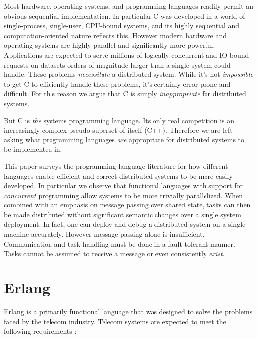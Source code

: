 \documentclass[10pt,a4paper,twocolumn]{article}
\begin{document}
Most hardware, operating systems, and programming languages readily permit an
obvious sequential implementation. In particular C was developed in a world of
single-process, single-user, CPU-bound systems, and its highly sequential and
computation-oriented nature reflects this. However modern hardware
and operating systems are highly parallel and significantly more powerful.
Applications are expected to serve millions of logically concurrent and IO-bound
requests on datasets orders of magnitude larger than a single system could
handle. These problems \emph{necessitate} a distributed system. While it's not
\emph{impossible} to get C to efficiently handle these problems, it's certainly
error-prone and difficult. For this reason we argue that C is simply
\emph{inappropriate} for distributed systems.

But C is \emph{the} systems programming language. Its only real competition is
an increasingly complex pseudo-superset of itself (C++). Therefore we are left
asking what programming languages \emph{are} appropriate for distributed systems
to be implemented in.

This paper surveys the programming language literature for how different
languages enable efficient and correct distributed systems to be more easily
developed. In particular we observe that functional languages with support for
\emph{concurrent} programming allow systems to be more trivially parallelized.
When combined with an emphasis on message passing over shared state, tasks can
then be made distributed without significant semantic changes over a single
system deployment. In fact, one can deploy and debug a distributed system on a
single machine accurately. However message passing alone is insufficient.
Communication and task handling must be done in a fault-tolerant manner. Tasks
cannot be assumed to receive a message or even consistently \emph{exist}.

\section{Erlang}

Erlang is a primarily functional language that was designed to solve the
problems faced by the telecom industry. Telecom systems are expected to meet the
following requirements \cite{dacker2000concurrent}:
\end{document}
